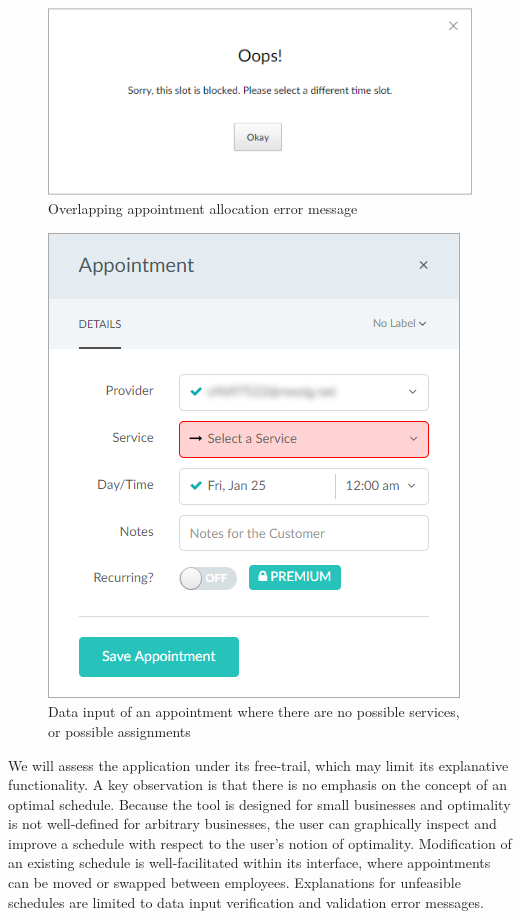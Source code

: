 \begin{figure}[H]
	\begin{center}
		\includegraphics[scale=0.6]{figures/setmore_overallocated.png}
	\end{center}
	\caption{Overlapping appointment allocation error message}
\end{figure}

\begin{figure}[H]
	\begin{center}
		\includegraphics[scale=0.6]{figures/setmore_no_service.png}
	\end{center}
	\caption{Data input of an appointment where there are no possible services, or possible assignments}
\end{figure}

We will assess the application under its free-trail, which may limit its explanative functionality. A key observation is that there is no emphasis on the concept of an optimal schedule. Because the tool is designed for small businesses and optimality is not well-defined for arbitrary businesses, the user can graphically inspect and improve a schedule with respect to the user's notion of optimality. Modification of an existing schedule is well-facilitated within its interface, where appointments can be moved or swapped between employees. Explanations for unfeasible schedules are limited to data input verification and validation error messages.


